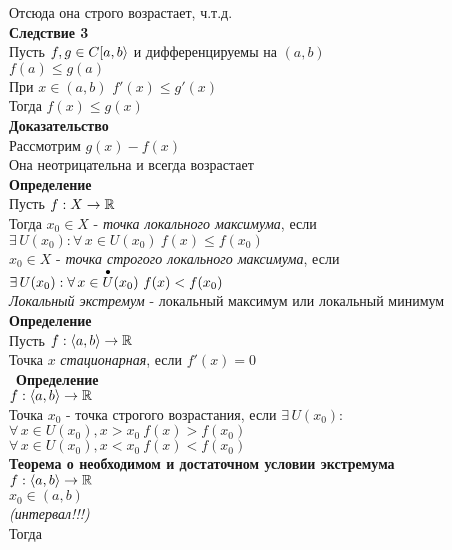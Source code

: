 \documentclass[12pt]{article}
\begin{document}
Отсюда она строго возрастает, ч.т.д.\\
\textbf{Следствие 3}\\
Пусть $f, g \in C [a,b\rangle$ и дифференцируемы на $(a,b)$\\
$f(a) \leq g(a)$\\
При $x\in(a,b)$ $f'(x) \leq g'(x)$\\
Тогда $f(x) \leq g(x)$\\
\textbf{Доказательство}\\
Рассмотрим $g(x) - f(x)$\\
Она неотрицательна и всегда возрастает\\
\textbf{Определение}\\
Пусть $f:X \rightarrow \mathbb{R}$\\
Тогда $x_0 \in X$ - \textit{точка локального максимума}, если $\exists\,U(x_0): \forall\,x\in U(x_0)\ f(x) \leq f(x_0)$\\
$x_0 \in X$ - \textit{точка строгого локального максимума}, если $\exists\,U(x_0): \forall\,x\in \overdot{U}(x_0)\ f(x) < f(x_0)$\\
\textit{Локальный экстремум} - локальный максимум или локальный минимум\\
\textbf{Определение}\\
Пусть $f:\langle a, b \rangle \rightarrow \mathbb{R}$\\
Точка $x$ \textit{стационарная}, если $f'(x) = 0$\\\
\textbf{Определение}\\
$f:\langle a,b \rangle \rightarrow \mathbb{R}$\\
Точка $x_0$ - точка строгого возрастания, если $\exists\,U(x_0):$\\
$\forall\,x \in U(x_0), x > x_0\ f(x) > f(x_0)$\\
$\forall\,x \in U(x_0), x < x_0\ f(x) < f(x_0)$\\
\textbf{Теорема о необходимом и достаточном условии экстремума}\\
$f: \langle a, b \rangle \rightarrow \mathbb{R}$\\
$x_0 \in (a,b)$\\
\textit{(интервал!!!)}\\
Тогда
\end{document}
